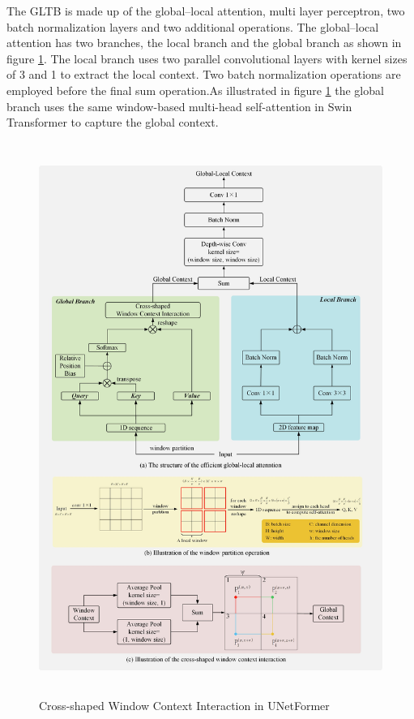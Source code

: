 The GLTB is made up of the global–local attention, multi layer perceptron, two batch normalization layers and two additional operations. The global–local attention has two  branches, the local branch and the global branch as shown in figure \ref{fig:unetformer-besar}. The local branch uses two parallel convolutional layers with kernel sizes of 3 and 1 to extract the local context. Two batch normalization operations are employed before the final sum operation.As illustrated in figure \ref{fig:unetformer-besar} the global branch uses the same window-based multi-head self-attention in Swin Transformer to capture the global context.
\FloatBarrier
\begin{figure}[ht]
\includegraphics[width=13.5cm, height=18cm]{images/unetformer besar.jpg}
\centering
\caption{Cross-shaped Window Context Interaction in UNetFormer \protect\cite{unetformer}}
\label{fig:unetformer-besar}
\end{figure}
\FloatBarrier

